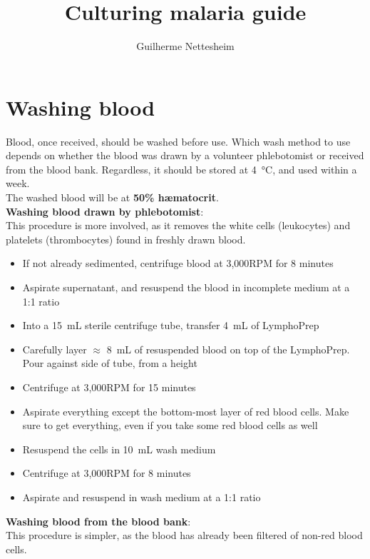 \documentclass{article}
\author{Guilherme Nettesheim}
\title{Culturing malaria guide}
\begin{document}
\maketitle

\section{Washing blood}

Blood, once received, should be washed before use. Which wash method to use depends on whether the blood was drawn by a volunteer phlebotomist or received from the blood bank. Regardless, it should be stored at \SI{4}{\celsius}, and used within a week.\\

The washed blood will be at \textbf{50\% h{\ae}matocrit}.\\

\textbf{Washing blood drawn by phlebotomist}:\\

This procedure is more involved, as it removes the white cells (leukocytes) and platelets (thrombocytes) found in freshly drawn blood.

\begin{itemize}
	\item If not already sedimented, centrifuge blood at 3,000RPM for 8 minutes
	\item Aspirate supernatant, and resuspend the blood in incomplete medium at a 1:1 ratio
	\item Into a \SI{15}{mL} sterile centrifuge tube, transfer \SI{4}{mL} of LymphoPrep
	\item Carefully layer $\approx$ \SI{8}{mL} of resuspended blood on top of the LymphoPrep. Pour against side of tube, from a height
	\item Centrifuge at 3,000RPM for 15 minutes
	\item Aspirate everything except the bottom-most layer of red blood cells. Make sure to get everything, even if you take some red blood cells as well
	\item Resuspend the cells in \SI{10}{mL} wash medium
	\item Centrifuge at 3,000RPM for 8 minutes
	\item Aspirate and resuspend in wash medium at a 1:1 ratio
\end{itemize}

\textbf{Washing blood from the blood bank}:\\

This procedure is simpler, as the blood has already been filtered of non-red blood cells.
\end{document}
